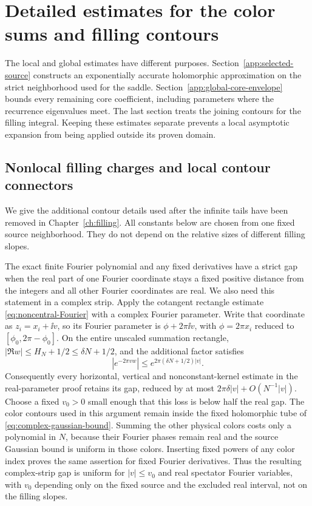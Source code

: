 \chapter{Detailed estimates for the color sums and filling contours}\label{app:analytic}

The local and global estimates have different purposes. Section~\ref{app:selected-source} constructs an exponentially accurate holomorphic approximation on the strict neighborhood used for the saddle. Section~\ref{app:global-core-envelope} bounds every remaining core coefficient, including parameters where the recurrence eigenvalues meet. The last section treats the joining contours for the filling integral. Keeping these estimates separate prevents a local asymptotic expansion from being applied outside its proven domain.



\section{Nonlocal filling charges and local contour connectors}\label{app:filling-contours}
We give the additional contour details used after the infinite tails have been removed in Chapter~\ref{ch:filling}. All constants below are chosen from one fixed source neighborhood. They do not depend on the relative sizes of different filling slopes.

The exact finite Fourier polynomial and any fixed derivatives have a
strict gap when the real part of one Fourier coordinate stays a fixed
positive distance from the integers and all other Fourier coordinates
are real. We also need this statement in a complex strip. Apply the cotangent rectangle estimate
\eqref{eq:noncentral-Fourier} with a complex Fourier parameter. Write that coordinate
as $z_i=x_i+\ii v$, so its Fourier parameter is
$\phi+2\pi\ii v$, with $\phi=2\pi x_i$ reduced to
$[\phi_0,2\pi-\phi_0]$. On the entire unscaled summation rectangle,
$|\Re w|\le H_N+1/2\le\delta N+1/2$, and the additional factor satisfies
\[
 |e^{-2\pi v w}|\le
 e^{2\pi(\delta N+1/2)|v|}.
\]
Consequently every horizontal, vertical and nonconstant-kernel estimate
in the real-parameter proof retains its gap, reduced by at most
$2\pi\delta|v|+O(N^{-1}|v|)$. Choose a fixed $v_0>0$ small enough
that this loss is below half the real gap. The color contours used in
this argument remain inside the fixed holomorphic tube of
\eqref{eq:complex-gaussian-bound}. Summing the other physical colors
costs only a polynomial in $N$, because their Fourier phases remain
real and the source Gaussian bound is uniform in those colors.
Inserting fixed powers of any color index proves the same assertion
for fixed Fourier derivatives. Thus the resulting complex-strip gap is
uniform for $|v|\le v_0$ and real spectator Fourier variables, with
$v_0$ depending only on the fixed source and the excluded real interval,
not on the filling slopes.

